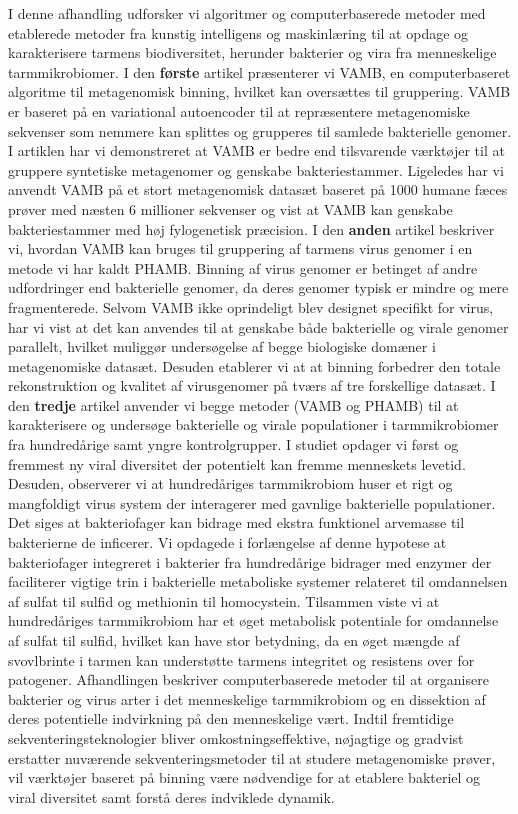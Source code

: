 I denne afhandling udforsker vi algoritmer og computerbaserede metoder med etablerede metoder fra kunstig intelligens og maskinlæring til at opdage og karakterisere tarmens biodiversitet, herunder bakterier og vira fra menneskelige tarmmikrobiomer. I den \textbf{første} artikel præsenterer vi VAMB, en computerbaseret algoritme til metagenomisk binning, hvilket kan oversættes til gruppering. VAMB er baseret på en variational autoencoder til at repræsentere metagenomiske sekvenser som nemmere kan splittes og grupperes til samlede bakterielle genomer. I artiklen har vi demonstreret at VAMB er bedre end tilsvarende værktøjer til at gruppere syntetiske metagenomer og genskabe bakteriestammer. Ligeledes har vi anvendt VAMB på et stort metagenomisk datasæt baseret på 1000 humane fæces prøver med næsten 6 millioner sekvenser og vist at VAMB kan genskabe bakteriestammer med høj fylogenetisk præcision. I den \textbf{anden} artikel beskriver vi, hvordan VAMB kan bruges til gruppering af tarmens virus genomer i en metode vi har kaldt PHAMB. Binning af virus genomer er betinget af andre udfordringer end bakterielle genomer, da deres genomer typisk er mindre og mere fragmenterede. Selvom VAMB ikke oprindeligt blev designet specifikt for virus, har vi vist at det kan anvendes til at genskabe både bakterielle og virale genomer parallelt, hvilket muliggør undersøgelse af begge biologiske domæner i metagenomiske datasæt. Desuden etablerer vi at at binning forbedrer den totale rekonstruktion og kvalitet af virusgenomer på tværs af tre forskellige datasæt. I den \textbf{tredje} artikel anvender vi begge metoder (VAMB og PHAMB) til at karakterisere og undersøge bakterielle og virale populationer i tarmmikrobiomer fra hundredårige samt yngre kontrolgrupper. I studiet opdager vi først og fremmest ny viral diversitet der potentielt kan fremme menneskets levetid. Desuden, observerer vi at hundredåriges tarmmikrobiom huser et rigt og mangfoldigt virus system der interagerer med gavnlige bakterielle populationer. Det siges at bakteriofager kan bidrage med ekstra funktionel arvemasse til bakterierne de inficerer. Vi opdagede i forlængelse af denne hypotese at bakteriofager integreret i bakterier fra hundredårige bidrager med enzymer der faciliterer vigtige trin i bakterielle metaboliske systemer relateret til omdannelsen af sulfat til sulfid og methionin til homocystein. Tilsammen viste vi at hundredåriges tarmmikrobiom har et øget metabolisk potentiale for omdannelse af sulfat til sulfid, hvilket kan have stor betydning, da en øget mængde af svovlbrinte i tarmen kan understøtte tarmens integritet og resistens over for patogener.
Afhandlingen beskriver computerbaserede metoder til at organisere bakterier og virus arter i det menneskelige tarmmikrobiom og en dissektion af deres potentielle indvirkning på den menneskelige vært. Indtil fremtidige sekventeringsteknologier bliver omkostningseffektive, nøjagtige og gradvist erstatter nuværende sekventeringsmetoder til at studere metagenomiske prøver, vil værktøjer baseret på binning være nødvendige for at etablere bakteriel og viral diversitet samt forstå deres indviklede dynamik.